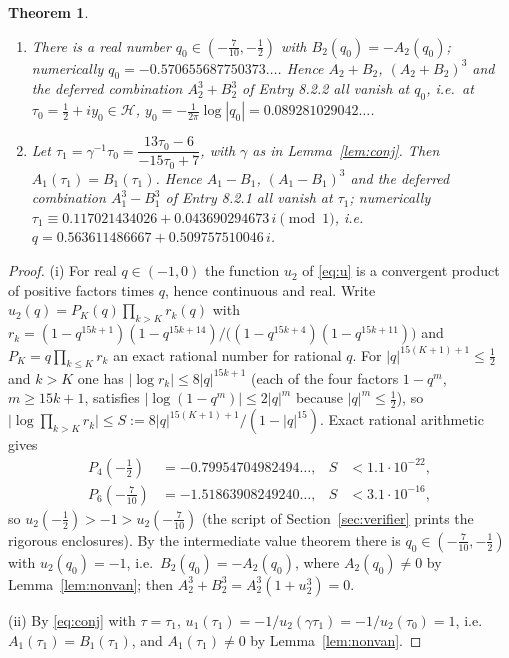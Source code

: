 \documentclass[pdflatex,sn-mathphys-num]{sn-jnl}
\theoremstyle{thmstyleone}%
\newtheorem{theorem}{Theorem}%
\theoremstyle{thmstyletwo}%
\newcommand{\HH}{\mathcal{H}}
\begin{document}
\begin{theorem}\label{thm:nol}
\begin{enumerate}
\item[(i)] There is a real number $q_0\in(-\frac{7}{10},-\frac12)$ with $B_2(q_0)=-A_2(q_0)$; numerically $q_0=-0.570655687750373\ldots$. Hence $A_2+B_2$, $(A_2+B_2)^3$ and the deferred combination $A_2^3+B_2^3$ of Entry 8.2.2 all vanish at $q_0$, i.e.\ at $\tau_0=\frac12+iy_0\in\HH$, $y_0=-\frac{1}{2\pi}\log|q_0|=0.089281029042\ldots$.
\item[(ii)] Let $\tau_1=\gamma^{-1}\tau_0=\dfrac{13\tau_0-6}{-15\tau_0+7}$, with $\gamma$ as in Lemma~\ref{lem:conj}. Then $A_1(\tau_1)=B_1(\tau_1)$. Hence $A_1-B_1$, $(A_1-B_1)^3$ and the deferred combination $A_1^3-B_1^3$ of Entry 8.2.1 all vanish at $\tau_1$; numerically $\tau_1\equiv 0.117021434026+0.043690294673\,i \pmod 1$, i.e.\ $q=0.563611486667+0.509757510046\,i$.
\end{enumerate}
\end{theorem}
\begin{proof}
(i) For real $q\in(-1,0)$ the function $u_2$ of \eqref{eq:u} is a convergent product of positive factors times $q$, hence continuous and real. Write $u_2(q)=P_K(q)\prod_{k>K}r_k(q)$ with
$r_k=(1-q^{15k+1})(1-q^{15k+14})/\bigl((1-q^{15k+4})(1-q^{15k+11})\bigr)$ and $P_K=q\prod_{k\le K}r_k$ an exact rational number for rational $q$. For $|q|^{15(K+1)+1}\le\frac12$ and $k>K$ one has $|\log r_k|\le 8|q|^{15k+1}$ (each of the four factors $1-q^{m}$, $m\ge 15k+1$, satisfies $|\log(1-q^m)|\le 2|q|^{m}$ because $|q|^m\le\frac12$), so $\bigl|\log\prod_{k>K}r_k\bigr|\le S:=8|q|^{15(K+1)+1}/(1-|q|^{15})$. Exact rational arithmetic gives
\begin{align*}
P_4(-\tfrac12)&=-0.79954704982494\ldots,&S&<1.1\cdot10^{-22},\\
P_6(-\tfrac{7}{10})&=-1.51863908249240\ldots,&S&<3.1\cdot10^{-16},
\end{align*}
so $u_2(-\frac12)>-1>u_2(-\frac7{10})$ (the script of Section~\ref{sec:verifier} prints the rigorous enclosures). By the intermediate value theorem there is $q_0\in(-\frac7{10},-\frac12)$ with $u_2(q_0)=-1$, i.e.\ $B_2(q_0)=-A_2(q_0)$, where $A_2(q_0)\ne0$ by Lemma~\ref{lem:nonvan}; then $A_2^3+B_2^3=A_2^3(1+u_2^3)=0$.

(ii) By \eqref{eq:conj} with $\tau=\tau_1$, $u_1(\tau_1)=-1/u_2(\gamma\tau_1)=-1/u_2(\tau_0)=1$, i.e.\ $A_1(\tau_1)=B_1(\tau_1)$, and $A_1(\tau_1)\ne0$ by Lemma~\ref{lem:nonvan}.
\end{proof}
\end{document}
